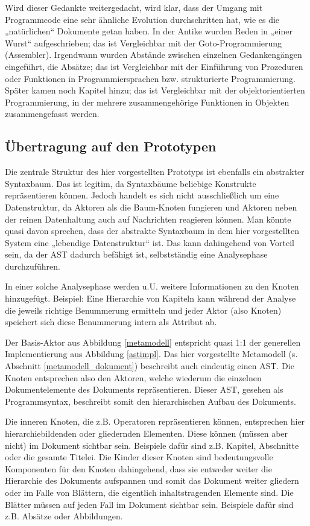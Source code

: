 Wird dieser Gedankte weitergedacht, wird klar, dass der Umgang mit Programmcode eine sehr ähnliche Evolution durchschritten hat, wie es die „natürlichen“ Dokumente getan haben. In der Antike wurden Reden in „einer Wurst“ aufgeschrieben; das ist Vergleichbar mit der Goto-Programmierung (Assembler). Irgendwann wurden Abstände zwischen einzelnen Gedankengängen eingeführt, die Absätze; das ist Vergleichbar mit der Einführung von Prozeduren oder Funktionen in Programmiersprachen bzw. strukturierte Programmierung. Später kamen noch Kapitel hinzu; das ist Vergleichbar mit der objektorientierten Programmierung, in der mehrere zusammengehörige Funktionen in Objekten zusammengefasst werden.

 
\subsection{Übertragung auf den Prototypen}\label{}
 
Die zentrale Struktur des hier vorgestellten Prototyps ist ebenfalls ein abstrakter Syntaxbaum. Das ist legitim, da Syntaxbäume beliebige Konstrukte repräsentieren können. Jedoch handelt es sich nicht ausschließlich um eine Datenstruktur, da Aktoren als die Baum-Knoten fungieren und Aktoren neben der reinen Datenhaltung auch auf Nachrichten reagieren können. Man könnte quasi davon sprechen, dass der abstrakte Syntaxbaum in dem hier vorgestellten System eine „lebendige Datenstruktur“ ist. Das kann dahingehend von Vorteil sein, da der AST dadurch befähigt ist, selbstständig eine Analysephase durchzuführen.

 
In einer solche Analysephase werden u.U. weitere Informationen zu den Knoten hinzugefügt. Beispiel: Eine Hierarchie von Kapiteln kann während der Analyse die jeweils richtige Benummerung ermitteln und jeder Aktor (also Knoten) speichert sich diese Benummerung intern als Attribut ab.

 
Der Basis-Aktor aus Abbildung \ref{metamodell} entspricht quasi 1:1 der generellen Implementierung aus Abbildung \ref{astimpl}. Das hier vorgestellte Metamodell (s. Abschnitt \ref{metamodell_dokument}) beschreibt auch eindeutig einen AST. Die Knoten entsprechen also den Aktoren, welche wiederum die einzelnen Dokumentelemente des Dokuments repräsentieren. Dieser AST, gesehen als Programmsyntax, beschreibt somit den hierarchischen Aufbau des Dokuments.

 
Die inneren Knoten, die z.B. Operatoren repräsentieren können, entsprechen hier hierarchiebildenden oder gliedernden Elementen. Diese können (müssen aber nicht) im Dokument sichtbar sein. Beispiele dafür sind z.B. Kapitel, Abschnitte oder die gesamte Titelei. Die Kinder dieser Knoten sind bedeutungsvolle Komponenten für den Knoten dahingehend, dass sie entweder weiter die Hierarchie des Dokuments aufspannen und somit das Dokument weiter gliedern oder im Falle von Blättern, die eigentlich inhaltstragenden Elemente sind. Die Blätter müssen auf jeden Fall im Dokument sichtbar sein. Beispiele dafür sind z.B. Absätze oder Abbildungen.

